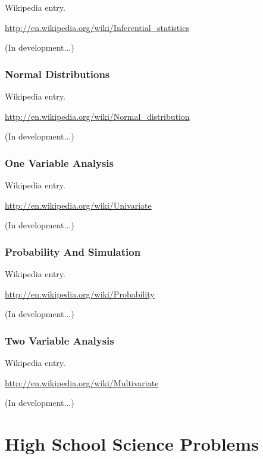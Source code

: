 \documentclass[12pt,twoside]{book}
\begin{document}
Wikipedia entry.

\href{http://en.wikipedia.org/wiki/Inferential_statistics}{http://en.wikipedia.org/wiki/Inferential\_statistics}

(In development...)

\subsection[Normal Distributions]{Normal Distributions}

Wikipedia entry.

\href{http://en.wikipedia.org/wiki/Normal_distribution}{http://en.wikipedia.org/wiki/Normal\_distribution}

(In development...)

\subsection[One Variable Analysis]{One Variable Analysis}

Wikipedia entry.

\href{http://en.wikipedia.org/wiki/Univariate}{http://en.wikipedia.org/wiki/Univariate}

(In development...)

\subsection[Probability And Simulation]{Probability And Simulation}

Wikipedia entry.

\href{http://en.wikipedia.org/wiki/Probability}{http://en.wikipedia.org/wiki/Probability}

(In development...)

\subsection[Two Variable Analysis]{Two Variable Analysis}

Wikipedia entry.

\href{http://en.wikipedia.org/wiki/Multivariate}{http://en.wikipedia.org/wiki/Multivariate}

(In development...)

\chapter[High School Science Problems]{High School Science Problems}
\end{document}
